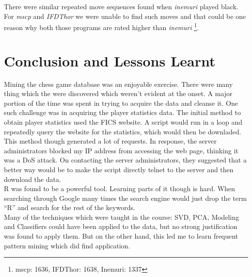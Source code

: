 \documentclass{article}
\begin{document}
There were similar repeated move sequences found when {\sl inemuri} played black. For {\sl mscp} and {\sl IFDThor} we were unable to find such moves and that could be one reason why both those programs are rated higher than {\sl inemuri} \footnote{mscp: 1636, IFDThor: 1638, Inemuri: 1337}.

\section{Conclusion and Lessons Learnt}

Mining the chess game database was an enjoyable exercise. There were many thing which the were discovered which weren't evident at the onset. A major portion of the time was spent in trying to acquire the data and cleanse it. One such challenge was in acquiring the player statistics data. The initial method to obtain player statistics used the FICS website. A script would run in a loop and repeatedly query the website for the statistics, which would then be downladed. This method though generated a lot of requests. In response, the server administrators blocked my IP address from accessing the web page, thinking it was a DoS attack. On contacting the server administrators, they suggested that a better way would be to make the script directly telnet to the server and then download the data. \\

R was found to be a powerful tool. Learning parts of it though is hard.  When searching through Google many times the search engine would just drop the term ``R'' and search for the rest of the keywords.\\ 

Many of the techniques which were taught in the course: SVD, PCA, Modeling and Classifiers could have been applied to the data, but no strong justification was found to apply them. But on the other hand, this led me to learn frequent pattern mining which did find application.

\pagebreak
\end{document}
